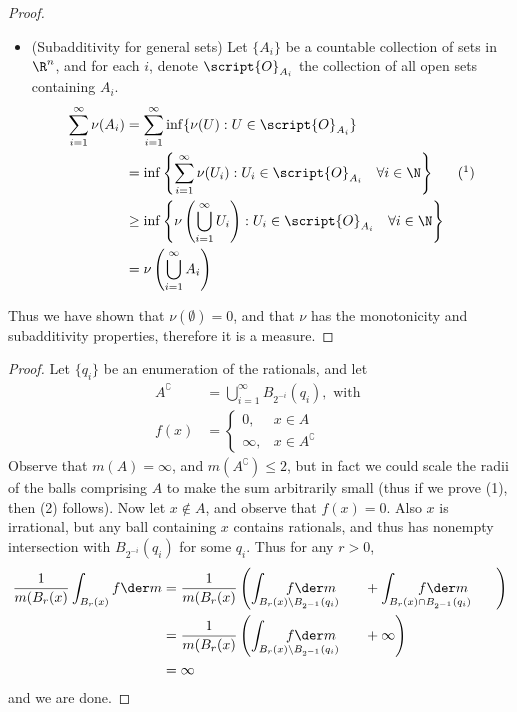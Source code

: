 \documentclass[12pt,letterpaper]{article}
\begin{document}
\begin{proof}
\begin{itemize}
\vfill
\pagebreak
\item (Subadditivity for general sets) Let $\{A_i\}$ be a countable collection of sets in $\R^n$, and for each $i$, denote $\script{O}_{A_i}$ the collection of all open sets containing $A_i$. 
\begin{align*}
\sum_{i=1}^\infty \nu(A_i) &= \sum_{i=1}^\infty \inf\{\nu(U) : U\in \script{O}_{A_i}\}\\
&= \inf\left\lbrace\sum_{i=1}^\infty\nu(U_i) : U_i\in \script{O}_{A_i} \quad \forall i\in \N\right\rbrace & (\footnotemark) \\
&\geq \inf\left\lbrace\nu\left (\bigcup_{i=1}^\infty U_i\right ) : U_i\in \script{O}_{A_i} \quad \forall i\in \N\right\rbrace \\
&=\nu\left (\bigcup_{i=1}^\infty A_i\right )
\end{align*}
\end{itemize} 
Thus we have shown that $\nu(\emptyset)=0$, and that $\nu$ has the monotonicity and subadditivity properties, therefore it is a measure.
\end{proof}

\begin{proof} Let $\{q_i\}$ be an enumeration of the rationals, and let
\begin{align*}
A^\complement&=\bigcup_{i=1}^{\infty}B_{2^{-i}}(q_i), \text{ with } \\
f(x)&= \begin{cases}
0, & x\in A\\ 
\infty, & x\in A^\complement
\end{cases}
\end{align*}
Observe that $m(A)=\infty$, and $m(A^\complement)\leq2$, but in fact we could scale the radii of the balls comprising $A$ to make the sum arbitrarily small (thus if we prove (1), then (2) follows).
\vfill
\pagebreak
Now let $x\not\in A$, and observe that $f(x)=0$. Also $x$ is irrational, but any ball containing $x$ contains rationals, and thus has nonempty intersection with $B_{2^{-i}}(q_i)$ for some $q_i$. Thus for any $r>0$, 
\begin{align*}
\frac{1}{m(B_r(x)}\int_{B_r(x)} f\der m 
&= \frac{1}{m(B_r(x)}\left(\int_{B_r(x)\setminus B_{2^{-1}}(q_{i})} \hspace*{-4em}f\der m\hspace*{2em} + \int_{B_r(x)\cap B_{2^{-1}}(q_{i})}\hspace*{-4em} f\der m \hspace*{2em}\right) \\
&= \frac{1}{m(B_r(x)}\left(\int_{B_r(x)\setminus B_{2^{-1}}(q_{i})} \hspace*{-4em}f\der m\hspace*{2em} + \infty \right)\\
&=\infty
\end{align*}
and we are done.
\end{proof}
\end{document}
